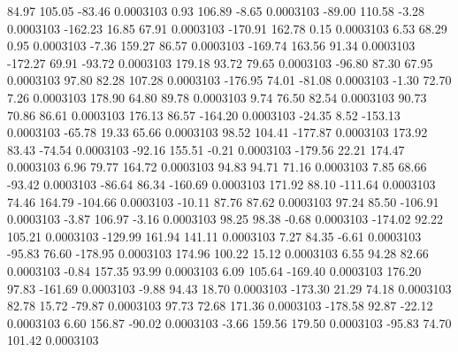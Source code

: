        84.97      105.05      -83.46     0.0003103
        0.93      106.89       -8.65     0.0003103
      -89.00      110.58       -3.28     0.0003103
     -162.23       16.85       67.91     0.0003103
     -170.91      162.78        0.15     0.0003103
        6.53       68.29        0.95     0.0003103
       -7.36      159.27       86.57     0.0003103
     -169.74      163.56       91.34     0.0003103
     -172.27       69.91      -93.72     0.0003103
      179.18       93.72       79.65     0.0003103
      -96.80       87.30       67.95     0.0003103
       97.80       82.28      107.28     0.0003103
     -176.95       74.01      -81.08     0.0003103
       -1.30       72.70        7.26     0.0003103
      178.90       64.80       89.78     0.0003103
        9.74       76.50       82.54     0.0003103
       90.73       70.86       86.61     0.0003103
      176.13       86.57     -164.20     0.0003103
      -24.35        8.52     -153.13     0.0003103
      -65.78       19.33       65.66     0.0003103
       98.52      104.41     -177.87     0.0003103
      173.92       83.43      -74.54     0.0003103
      -92.16      155.51       -0.21     0.0003103
     -179.56       22.21      174.47     0.0003103
        6.96       79.77      164.72     0.0003103
       94.83       94.71       71.16     0.0003103
        7.85       68.66      -93.42     0.0003103
      -86.64       86.34     -160.69     0.0003103
      171.92       88.10     -111.64     0.0003103
       74.46      164.79     -104.66     0.0003103
      -10.11       87.76       87.62     0.0003103
       97.24       85.50     -106.91     0.0003103
       -3.87      106.97       -3.16     0.0003103
       98.25       98.38       -0.68     0.0003103
     -174.02       92.22      105.21     0.0003103
     -129.99      161.94      141.11     0.0003103
        7.27       84.35       -6.61     0.0003103
      -95.83       76.60     -178.95     0.0003103
      174.96      100.22       15.12     0.0003103
        6.55       94.28       82.66     0.0003103
       -0.84      157.35       93.99     0.0003103
        6.09      105.64     -169.40     0.0003103
      176.20       97.83     -161.69     0.0003103
       -9.88       94.43       18.70     0.0003103
     -173.30       21.29       74.18     0.0003103
       82.78       15.72      -79.87     0.0003103
       97.73       72.68      171.36     0.0003103
     -178.58       92.87      -22.12     0.0003103
        6.60      156.87      -90.02     0.0003103
       -3.66      159.56      179.50     0.0003103
      -95.83       74.70      101.42     0.0003103
